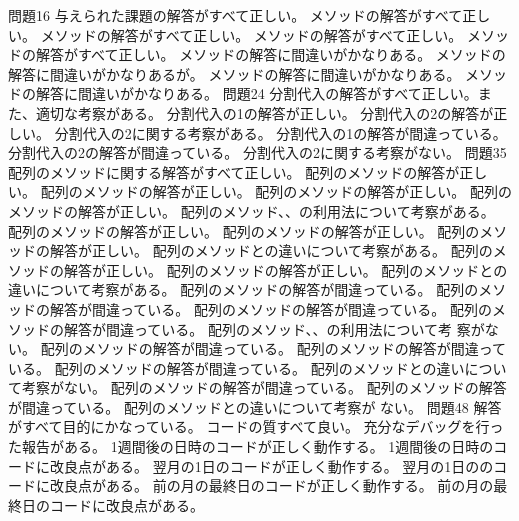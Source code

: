 {{問題1}{6}{
  {与えられた課題の解答がすべて正しい。}
	}
	{
	{メソッドの解答がすべて正しい。}
	{メソッドの解答がすべて正しい。}
	{メソッドの解答がすべて正しい。}
	{メソッドの解答がすべて正しい。}
	}
	{
	{メソッドの解答に間違いがかなりある。}
	{メソッドの解答に間違いがかなりあるが。}
	{メソッドの解答に間違いがかなりある。}
	{メソッドの解答に間違いがかなりある。}
	}
  {問題2}{4}{
	{分割代入の解答がすべて正しい。また、適切な考察がある。}
  }
  {
	{分割代入の1の解答が正しい。}
	{分割代入の2の解答が正しい。}
	{分割代入の2に関する考察がある。}
  }
  {
	{分割代入の1の解答が間違っている。}
	{分割代入の2の解答が間違っている。}
	{分割代入の2に関する考察がない。}
  }
  {問題3}{5}{
  {配列のメソッドに関する解答がすべて正しい。}
  }
  {
  {配列のメソッドの解答が正しい。}
  {配列のメソッドの解答が正しい。}
  {配列のメソッドの解答が正しい。}
  {配列のメソッドの解答が正しい。}
  {配列のメソッド、、の利用法について考察がある。}
  {配列のメソッドの解答が正しい。}
  {配列のメソッドの解答が正しい。}
  {配列のメソッドの解答が正しい。}
  {配列のメソッドとの違いについて考察がある。}
  {配列のメソッドの解答が正しい。}
  {配列のメソッドの解答が正しい。}
  {配列のメソッドとの違いについて考察がある。}
  }
  {
  {配列のメソッドの解答が間違っている。}
  {配列のメソッドの解答が間違っている。}
  {配列のメソッドの解答が間違っている。}
  {配列のメソッドの解答が間違っている。}
  {配列のメソッド、、の利用法について考
  察がない。}
  {配列のメソッドの解答が間違っている。}
  {配列のメソッドの解答が間違っている。}
  {配列のメソッドの解答が間違っている。}
  {配列のメソッドとの違いについて考察がない。}
  {配列のメソッドの解答が間違っている。}
  {配列のメソッドの解答が間違っている。}
  {配列のメソッドとの違いについて考察が
  ない。}
  }
	{問題4}{8}
	{
  {解答がすべて目的にかなっている。}
  {コードの質すべて良い。}
  {充分なデバッグを行った報告がある。}
  }
	{
  {1週間後の日時のコードが正しく動作する。}
  {1週間後の日時のコードに改良点がある。}
  {翌月の1日のコードが正しく動作する。}
  {翌月の1日ののコードに改良点がある。}
  {前の月の最終日のコードが正しく動作する。}
  {前の月の最終日のコードに改良点がある。}
}}
